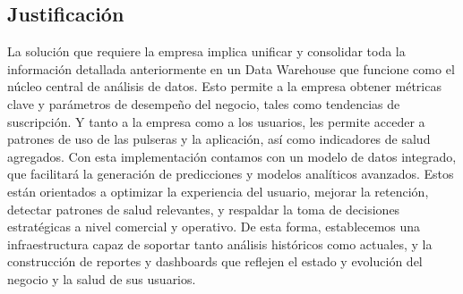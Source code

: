 \subsection{Justificación}
La solución que requiere la empresa implica unificar y consolidar toda la información detallada anteriormente en un Data Warehouse que funcione como el núcleo central de análisis de datos. Esto permite a la empresa obtener métricas clave y parámetros de desempeño del negocio, tales como tendencias de suscripción. Y tanto a la empresa como a los usuarios, les permite acceder a patrones de uso de las pulseras y la aplicación, así como indicadores de salud agregados.
Con esta implementación contamos con un modelo de datos integrado, que facilitará la generación de predicciones y modelos analíticos avanzados. Estos están orientados a optimizar la experiencia del usuario, mejorar la retención, detectar patrones de salud relevantes, y respaldar la toma de decisiones estratégicas a nivel comercial y operativo. De esta forma, establecemos una infraestructura capaz de soportar tanto análisis históricos como actuales, y la construcción de reportes y dashboards que reflejen el estado y evolución del negocio y la salud de sus usuarios.
